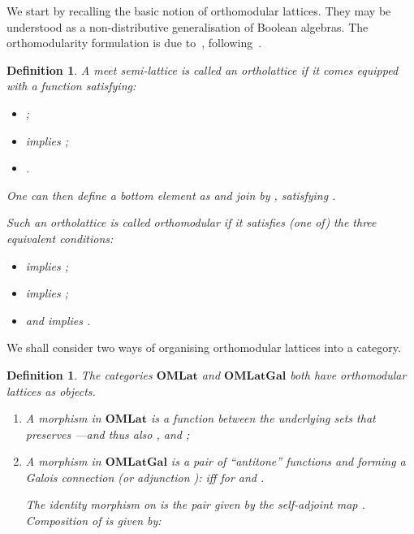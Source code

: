 \documentclass{article}
\newtheorem{definition}[theorem]{Definition}
\newcommand{\Cat}[1]{\ensuremath{\mathbf{#1}}}
\begin{document}
We start by recalling the basic notion of orthomodular lattices.  They
may be understood as a non-distributive generalisation of Boolean
algebras. The orthomodularity formulation is due to~\cite{Husimi37},
following~\cite{BirkhoffN36}.



\begin{definition}
\label{OMLatDef}
A meet semi-lattice  is called an ortholattice if it
comes equipped with a function  satisfying:
\begin{itemize}
   \item ;
   \item  implies ;
   \item .
\end{itemize}

\noindent One can then define a bottom element as  and join by , satisfying .

Such an ortholattice is called orthomodular if it satisfies (one of)
the three equivalent conditions:
\begin{itemize}
\item  implies ;

\item  implies ;

\item  and  implies .
\end{itemize}
\end{definition}


We shall consider two ways of organising orthomodular lattices
into a category.


\begin{definition}
The categories \Cat{OMLat} and \Cat{OMLatGal} both have orthomodular
lattices as objects.
\begin{enumerate}
\item A morphism  in \Cat{OMLat} is a function
   between the underlying sets that preserves
  ---and thus also ,  and ;

\item A morphism  in \Cat{OMLatGal} is a pair  of ``antitone'' functions  and  forming a Galois
  connection (or adjunction ):  iff
   for  and .

The identity morphism on  is the pair  given by the
self-adjoint map . Composition of  is given by:

\end{enumerate}
\end{definition}
\end{document}

